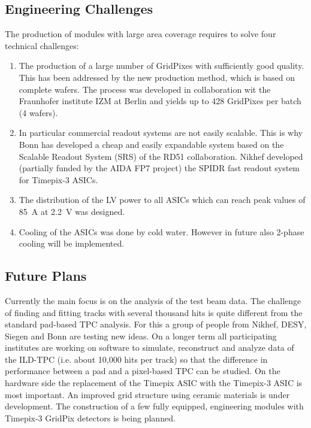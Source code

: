 \subsection{Engineering Challenges}
The production of modules with large area coverage requires to solve four
technical challenges:
\begin{enumerate}
\item The production of a large number of GridPixes with sufficiently good
quality. This has been addressed by the new production method, which is based
on complete wafers. The process was developed in collaboration wit the
Fraunhofer institute IZM at Berlin and yields up to 428 GridPixes per batch (4 wafers).

\item In particular commercial readout systems are not easily scalable. This is why Bonn has developed a cheap and easily expandable system based on the Scalable Readout System (SRS) of the RD51 collaboration.
Nikhef developed (partially funded by the AIDA FP7 project) the SPIDR fast readout system for Timepix-3 ASICs.

\item The distribution of the LV power to all ASICs which can reach peak values
of \SI{85}{A} at \SI{2.2}{V} was designed.

\item Cooling of the ASICs was done by cold water. However in future also 2-phase  cooling will be implemented.
\end{enumerate}

\subsection{Future Plans}
Currently the main focus is on the analysis of the test beam data. The
challenge of finding and fitting tracks with several thousand hits is quite
different from the standard pad-based TPC analysis. For this a group of people
from Nikhef, DESY, Siegen and Bonn are testing new ideas. On a longer term all
participating institutes are working on software to simulate, reconstruct and
analyze data of the ILD-TPC (i.e. about 10,000 hits per track) so that the
difference in performance between a pad and a pixel-based TPC can be studied.
On the hardware side the replacement of the Timepix ASIC with the Timepix-3
ASIC is most important.
An improved grid structure using ceramic materials is under development.
The construction of a few fully equipped, engineering modules with Timepix-3
GridPix detectors is being planned.
